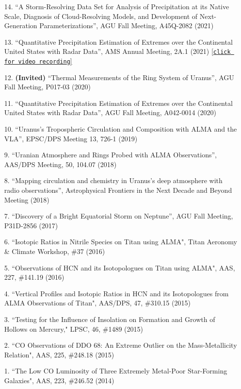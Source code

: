 \documentclass[margin, 10pt]{res} %
\begin{document}
\begin{resume}
\begin{enumerate}
\item[14.] ``A Storm-Resolving Data Set for Analysis of Precipitation at its Native Scale, Diagnosis of Cloud-Resolving Models, and Development of Next-Generation Parameterizations'', AGU Fall Meeting, A45Q-2082 (2021)
\item[13.] ``Quantitative Precipitation Estimation of Extremes over the Continental United States with Radar Data'', AMS Annual Meeting, 2A.1 (2021) \href{https://ams.confex.com/ams/101ANNUAL/meetingapp.cgi/Paper/381114}{[\texttt{click for video recording}]}
\item[12.] \textbf{(Invited)} ``Thermal Measurements of the Ring System of Uranus'', AGU Fall Meeting, P017-03 (2020)
\item[11.] ``Quantitative Precipitation Estimation of Extremes over the Continental United States with Radar Data'', AGU Fall Meeting, A042-0014 (2020)
\item[10.] ``Uranus's Tropospheric Circulation and Composition with ALMA and the VLA'', EPSC/DPS Meeting 13, 726-1 (2019)
\item[9.] ``Uranian Atmosphere and Rings Probed with ALMA Observations'', AAS/DPS Meeting, 50, 104.07 (2018)
\item[8.] ``Mapping circulation and chemistry in Uranus's deep atmosphere with radio observations'', Astrophysical Frontiers in the Next Decade and Beyond Meeting (2018)
\item[7.] ``Discovery of a Bright Equatorial Storm on Neptune'', AGU Fall Meeting, P31D-2856 (2017)
\item[6.] ``Isotopic Ratios in Nitrile Species on Titan using ALMA", Titan Aeronomy \& Climate Workshop, \#37 (2016)
\item[5.] ``Observations of HCN and its Isotopologues on Titan using ALMA", AAS, 227, \#141.19 (2016)
\item[4.] ``Vertical Profiles and Isotopic Ratios in HCN and its Isotopologues from ALMA Observations of Titan", AAS/DPS, 47, \#310.15 (2015)
\item[3.] ``Testing for the Influence of Insolation on Formation and Growth of Hollows on Mercury," LPSC, 46, \#1489 (2015)
\item[2.] ``CO Observations of DDO 68: An Extreme Outlier on the Mass-Metallicity Relation", AAS, 225, \#248.18 (2015)
\item[1.] ``The Low CO Luminosity of Three Extremely Metal-Poor Star-Forming Galaxies", AAS, 223, \#246.52 (2014)
\end{enumerate}



\end{resume}
\end{document}
